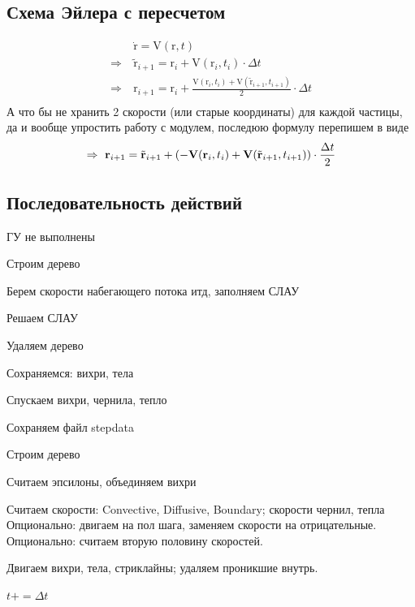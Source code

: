 \documentclass[14pt]{extreport}
\newcommand{\br}[1]{\boldsymbol{\mathrm{#1}}}
\newenvironment{packed_enum}{
\begin{enumerate}
  \setlength{\itemsep}{1pt}
  \setlength{\parskip}{0pt}
  \setlength{\parsep}{0pt}
}{\end{enumerate}}
\begin{document}
\subsection{Схема Эйлера с пересчетом}
\begin{equation*}\begin{split}
&\dot{\br r} = \br V (\br r, t) \\
\Rightarrow~&\tilde{\br r}_{i+1} = \br r_i + \br V(\br r_i, t_i) \cdot \Delta t \\
\Rightarrow~&\br r_{i+1} = \br r_i + 
\frac{\br V(\br r_i, t_i) + \br V( \tilde{\br r}_{i+1}, t_{i+1})}{2}\cdot \Delta t \\
\end{split}\end{equation*}
А что бы не хранить 2 скорости (или старые координаты) для
каждой частицы, да и вообще упростить работу с модулем,
последюю формулу перепишем в виде
\begin{equation*}
\Rightarrow~\br r_{i+1} = \tilde{\br r}_{i+1} + 
\left( -\br V(\br r_i, t_i) + \br V( \tilde{\br r}_{i+1}, t_{i+1}) \right)\cdot \frac{\Delta t}{2} \\
\end{equation*}

\subsection{Последовательность действий}
\begin{packed_enum}
\item ГУ не выполнены\\
\item Строим дерево
\item Берем скорости набегающего потока итд, заполняем СЛАУ
\item Решаем СЛАУ
\item Удаляем дерево\\
\item Сохраняемся: вихри, тела
\item Спускаем вихри, чернила, тепло
\item Сохраняем файл stepdata\\
\item Строим дерево
\item Считаем эпсилоны, объединяем вихри
\item Считаем скорости: Convective, Diffusive, Boundary; скорости чернил, тепла
\subitem Опционально: двигаем на пол шага, заменяем скорости на отрицательные.
\subitem Опционально: считаем вторую половину скоростей.
\item Двигаем вихри, тела, стриклайны; удаляем проникшие внутрь.
\item $t += \Delta t$
\end{packed_enum}
\end{document}
